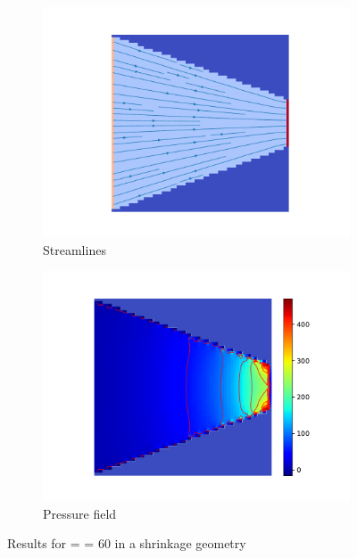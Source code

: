\begin{figure}[htbp]
      \centering
      \begin{subfigure}{.45\textwidth}
            \includegraphics[width=.99\linewidth]{alpha_v2/figures/streamlines_shrinkage_Nx=60_Ny=60.pdf}
            \caption{Streamlines}\label{fig:streamlines}
      \end{subfigure}
      \begin{subfigure}{.45\textwidth}
            \includegraphics[width=.99\linewidth]{alpha_v2/figures/pressure_shrinkage_Nx=60_Ny=60.pdf}
            \caption{Pressure field}\label{fig:pressure_field}
      \end{subfigure}
      \caption{Results for  =  = \num{60} in a shrinkage geometry}
\end{figure}
\newpage
